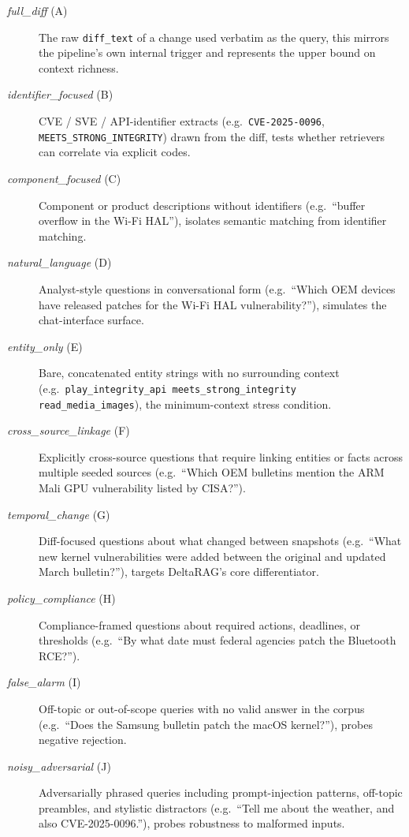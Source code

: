 \documentclass[
]{article}
\begin{document}
\begin{description}
  \item[\textit{full\_diff} (A)] The raw \texttt{diff\_text} of a change
    used verbatim as the query, this mirrors the pipeline's own
    internal trigger and represents the upper bound on context richness.
  \item[\textit{identifier\_focused} (B)] CVE / SVE / API-identifier
    extracts (e.g.\ \texttt{CVE-2025-0096}, \texttt{MEETS\_STRONG\_INTEGRITY})
    drawn from the diff, tests whether retrievers can correlate via
    explicit codes.
  \item[\textit{component\_focused} (C)] Component or product descriptions
    without identifiers (e.g.\ ``buffer overflow in the Wi-Fi HAL''),
    isolates semantic matching from identifier matching.
  \item[\textit{natural\_language} (D)] Analyst-style questions in
    conversational form (e.g.\ ``Which OEM devices have released patches
    for the Wi-Fi HAL vulnerability?''), simulates the chat-interface
    surface.
  \item[\textit{entity\_only} (E)] Bare, concatenated entity strings with
    no surrounding context (e.g.\ \texttt{play\_integrity\_api meets\_strong\_integrity
    read\_media\_images}), the minimum-context stress condition.
  \item[\textit{cross\_source\_linkage} (F)] Explicitly cross-source
    questions that require linking entities or facts across multiple
    seeded sources (e.g.\ ``Which OEM bulletins mention the ARM Mali GPU
    vulnerability listed by CISA?'').
  \item[\textit{temporal\_change} (G)] Diff-focused questions about
    what changed between snapshots (e.g.\ ``What new kernel
    vulnerabilities were added between the original and updated March
    bulletin?''), targets DeltaRAG's core differentiator.
  \item[\textit{policy\_compliance} (H)] Compliance-framed questions
    about required actions, deadlines, or thresholds (e.g.\ ``By what
    date must federal agencies patch the Bluetooth RCE?'').
  \item[\textit{false\_alarm} (I)] Off-topic or out-of-scope queries
    with no valid answer in the corpus (e.g.\ ``Does the Samsung
    bulletin patch the macOS kernel?''), probes negative rejection.
  \item[\textit{noisy\_adversarial} (J)] Adversarially phrased queries
    including prompt-injection patterns, off-topic preambles, and
    stylistic distractors (e.g.\ ``Tell me about the weather, and also
    CVE-2025-0096.''), probes robustness to malformed inputs.
\end{description}
\end{document}
